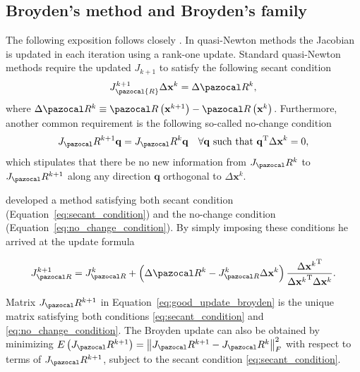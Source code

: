 \subsection{Broyden's method and Broyden's family}

The following exposition follows closely \cite{fang_two_2009}.
In quasi-Newton methods the Jacobian is updated in each iteration using a rank-one update.
Standard quasi-Newton methods require the updated \(J_{k+1}\) to satisfy the following secant condition
\begin{equation} \label{eq:secant_condition}
J_\pazocal{R}^{k+1} \Delta \mathbf x^{k}=\Delta \pazocal R^{k},
\end{equation}
where \(\Delta \pazocal R^{k}\equiv \pazocal R\left(\mathbf x^{k+1}\right)-\pazocal R\left(\mathbf x^ {k}\right)\).
Furthermore, another common requirement is the following so-called no-change condition
\begin{equation} \label{eq:no_change_condition}
J_\pazocal R^{k+1} \mathbf q=J_\pazocal R^{k} \mathbf q \quad \forall \mathbf q \text { such that } \mathbf q^{\mathrm{T}} \Delta \mathbf x^{k}=0,
\end{equation}
which stipulates that there be no new information from \(J_\pazocal R^{k}\) to \(J_\pazocal R^{k+1}\) along any direction \(\mathbf q\) orthogonal to \(\Delta \mathbf x^{k}\).

\cite{broyden} developed a method satisfying both secant condition (Equation~\eqref{eq:secant_condition}) and the no-change condition (Equation~\eqref{eq:no_change_condition}).
By simply imposing these conditions he arrived at the update formula
\begin{highlight}
\begin{equation} \label{eq:good_update_broyden}
J_{\pazocal R}^{k+1}=J_{\pazocal R}^{k}+\left(\Delta \pazocal R^{k}-J_{\pazocal R}^{k} \Delta \mathbf x^{k}\right) \frac{\Delta {\mathbf x^{k}}^{\mathrm{T}}}{\Delta {\mathbf x^{k}}^{\mathrm{T}} \Delta \mathbf x^{k}}.
\end{equation}
\end{highlight}

Matrix \(J_\pazocal R^{k+1}\) in Equation~\eqref{eq:good_update_broyden} is the unique matrix satisfying both conditions \eqref{eq:secant_condition} and \eqref{eq:no_change_condition}.
The Broyden update can also be obtained by minimizing \(E\left(J_\pazocal R^{k+1}\right)=\left\|J_\pazocal R^{k+1}-J_\pazocal R^{k}\right\|_{F}^{2}\) with respect to terms of \(J_\pazocal R^{k+1}\), subject to the secant condition \eqref{eq:secant_condition}.

